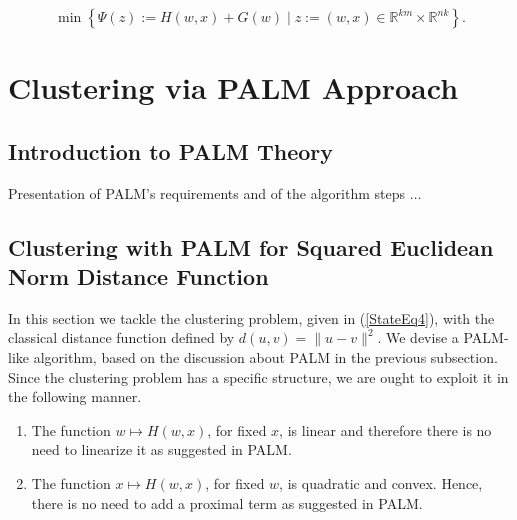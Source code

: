 \documentclass[11pt]{article}
\numberwithin{equation}{section}
\begin{document}
\begin{equation}
	\min \left\lbrace \Psi(z) := H(w,x) + G(w) \mid z := (w,x) \in \mathbb{R}^{km} \times \mathbb{R}^{nk} \right\rbrace . \label{StateEq4}
\end{equation}


\section{Clustering via PALM Approach}

\subsection{Introduction to PALM Theory} \label{State_PALM_Theory}

Presentation of PALM's requirements and of the algorithm steps  $\ldots$


\subsection{Clustering with PALM for Squared Euclidean Norm Distance Function}

In this section we tackle the clustering problem, given in (\ref{StateEq4}), with the classical distance function defined by $d(u,v) = \|u-v\|^2$. We devise a PALM-like algorithm, based on the discussion about PALM in the previous subsection.
Since the clustering problem has a specific structure, we are ought to exploit it in the following manner.
\begin{enumerate}[(1)]
	\item The function $w \mapsto H(w,x)$, for fixed $x$, is linear and therefore there is no need to linearize it as suggested in PALM.
	\item The function $x \mapsto H(w,x)$, for fixed $w$, is quadratic and convex. Hence, there is no need to add a proximal term as suggested in PALM.
\end{enumerate}
\end{document}

